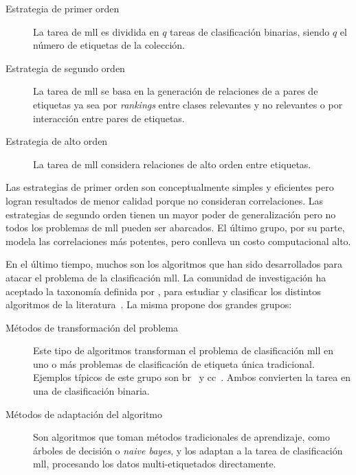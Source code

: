 \begin{description}
	\label{estrategias_mll}

	\item[Estrategia de primer orden] La tarea de \acrshort{mll} es dividida en
	      $q$ tareas de clasificación binarias, siendo $q$ el número de etiquetas de
	      la colección.

	\item[Estrategia de segundo orden] La tarea de \acrshort{mll} se basa en la
	      generación de relaciones de a pares de etiquetas ya sea por
	      \textit{rankings} entre clases relevantes y no relevantes o por
	      interacción entre pares de etiquetas.

	\item[Estrategia de alto orden] La tarea de \acrshort{mll} considera
	      relaciones de alto orden entre etiquetas.

\end{description}

Las estrategias de primer orden son conceptualmente simples y eficientes pero
logran resultados de menor calidad porque no consideran correlaciones. Las
estrategias de segundo orden tienen un mayor poder de generalización pero no
todos los problemas de \acrshort{mll} pueden ser abarcados. El último grupo, por
su parte, modela las correlaciones más potentes, pero conlleva un costo
computacional alto.

En el último tiempo, muchos son los algoritmos que han sido desarrollados para
atacar el problema de la clasificación \acrshort{mll}. La comunidad de
investigación ha aceptado la taxonomía definida
por \citeauthor{tsoumakas_multi-label_2007}, para estudiar y clasificar los
distintos algoritmos de la literatura~\cite {gibaja_tutorial_2015}. La misma
propone dos grandes grupos:

\begin{description}

	\item[Métodos de transformación del problema] Este tipo de algoritmos
	      transforman el problema de clasificación \acrshort{mll} en uno o más
	      problemas de clasificación de etiqueta única tradicional.  Ejemplos
	      típicos de este grupo son \acrfull{br}~\cite{tsoumakas_multi-label_2007}
	      y \acrfull{cc}~\cite{read_classifier_2011}. Ambos convierten la tarea en
	      una de clasificación binaria.

	\item[Métodos de adaptación del algoritmo] Son algoritmos que toman métodos
	      tradicionales de aprendizaje, como árboles de decisión o \textit{naive
		      bayes}, y los adaptan a la tarea de clasificación \acrshort{mll},
	      procesando los datos multi-etiquetados directamente.

\end{description}

